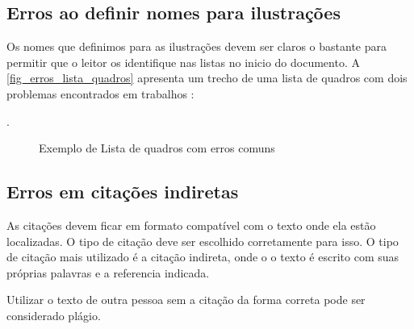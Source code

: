 \subsection{Erros ao definir nomes para ilustrações}

Os nomes que definimos para as ilustrações devem ser claros o bastante para permitir que o leitor os identifique nas listas no inicio do documento. A \autoref{fig_erros_lista_quadros} apresenta um trecho de uma lista de quadros com dois problemas encontrados em trabalhos :
\begin{itemize}
    .
\end{itemize}


\begin{figure}[htb]
    \centering
	\caption{\label{fig_erros_lista_quadros}Exemplo de Lista de quadros com erros comuns}
\end{figure}


\subsection{Erros em citações indiretas}
\label{erros-citacoes-indiretas}

As citações devem ficar em formato compatível com o texto onde ela estão localizadas. O tipo de citação deve ser escolhido corretamente para isso. O tipo de citação mais utilizado é a citação indireta, onde o o texto é escrito com suas próprias palavras e a referencia indicada.

Utilizar o texto de outra pessoa sem a citação da forma correta pode ser considerado plágio.

